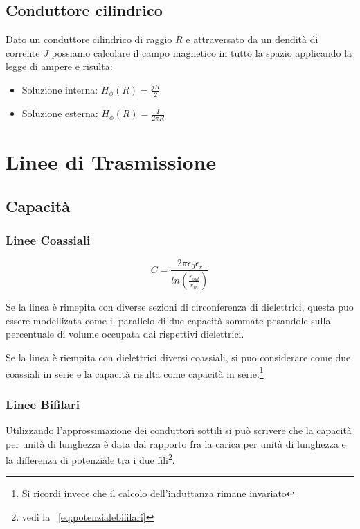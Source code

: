 \documentclass[10pt,a4paper]{report}
\begin{document}
	\section{Conduttore cilindrico}
		Dato un conduttore cilindrico di raggio $R$ e attraversato da un dendità di corrente $J$ possiamo calcolare il campo magnetico in tutto la spazio applicando la legge di ampere e risulta:

		\begin{itemize}
		\item Soluzione interna: $H_\phi(R)=\frac{jR}{2}$ 
		\item Soluzione esterna: $H_\phi(R)=\frac{I}{2\pi R}$

		\end{itemize}

\chapter{Linee di Trasmissione}

	\section{Capacità}

	
		\subsection{Linee Coassiali}
				\begin{equation}
				C=\frac{2\pi \epsilon_0 \epsilon_r} {ln (\frac { r_{out}} {r_{in} } )}
				\end{equation}

				Se la linea è rimepita con diverse sezioni di circonferenza di dielettrici, questa puo essere modellizata come il parallelo di due capacità sommate pesandole sulla percentuale di volume occupata dai rispettivi dielettrici.
			
				Se la linea è riempita con dielettrici diversi coassiali, si puo considerare come due coassiali in serie e la capacità risulta come capacità in serie.\footnote{Si ricordi invece che il calcolo dell'induttanza rimane invariato}


		\subsection{Linee Bifilari}

			Utilizzando l'approssimazione dei conduttori sottili si può scrivere che la capacità per unità di lunghezza è data dal rapporto fra la carica per unità di lunghezza e la 
			differenza di potenziale tra i due fili\footnote{vedi la ~\ref{eq:potenzialebifilari}}.
			
\end{document}
